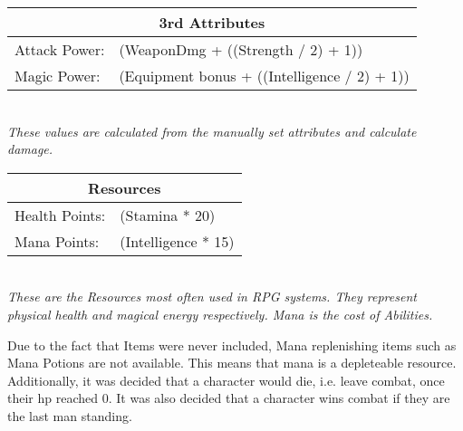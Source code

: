\begin{center}
\begin{tabular}{|l l|}
\hline
\multicolumn{2}{|c|}{\textbf{3rd Attributes}}\\
\hline
Attack Power: & (WeaponDmg + ((Strength / 2) + 1))\\
\hline
Magic Power: & (Equipment bonus + ((Intelligence / 2) + 1))\\
\hline
\end{tabular}\\
\emph{These values are calculated from the manually set attributes and calculate damage.}
\end{center}

\begin{center}
\begin{tabular}{|l l|}
\hline
\multicolumn{2}{|c|}{\textbf{Resources}}\\
\hline
Health Points: & (Stamina * 20)\\
\hline
Mana Points: & (Intelligence * 15)\\
\hline
\end{tabular}\\
\emph{These are the Resources most often used in RPG systems. They represent physical health and magical energy respectively. Mana is the cost of Abilities.}
\end{center}

Due to the fact that Items were never included, Mana replenishing items such as Mana Potions are not available. This means that mana is a depleteable resource.
Additionally, it was decided that a character would die, i.e. leave combat, once their \ac{hp} reached 0.  It was also decided that a character wins combat if they are the last man standing.